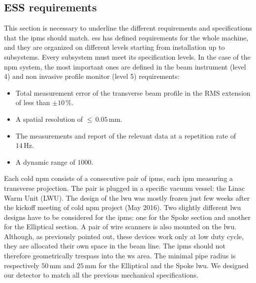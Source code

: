 \begin{refsection}
  \section{ESS requirements}
  This section is necessary to underline the different requirements and specifications that the \acrshort{ipm}s should match. \acrshort{ess} has defined requirements for the whole machine, and they are organized on different levels starting from installation up to subsystems. Every subsystem must meet its specification levels. In the case of the \acrshort{npm} system, the most important ones are defined in the beam instrument (level 4) and non invasive profile monitor (level 5) requirements:
  \begin{itemize}
    \item Total measurement error of the transverse beam profile in the RMS extension of less than $\pm10\,\%$.
    \item A spatial resolution of \(\leq\,0.05\,\mathrm{mm}\).
    \item The measurements and report of the relevant data at a repetition rate of \(14\,\mathrm{Hz}\).
    \item A dynamic range of $1000$.
  \end{itemize}

  Each cold \acrshort{npm} consists of a consecutive pair of \acrshort{ipm}s, each \acrshort{ipm} measuring a transverse projection. The pair is plugged in a specific vacuum vessel: the Linac Warm Unit (LWU). The design of the \acrshort{lwu} was mostly frozen just few weeks after the kickoff meeting of cold \acrshort{npm} project (May 2016). Two slightly different \acrshort{lwu} designs have to be considered for the \acrshort{ipm}s: one for the Spoke section and another for the Elliptical section. A pair of wire scanners is also mounted on the \acrshort{lwu}. Although, as previously pointed out, these devices work only at low duty cycle, they are allocated their own space in the beam line. The \acrshort{ipm}s should not therefore geometrically trespass into the \acrshort{ws} area. The minimal pipe radius is respectively \(50\,\mathrm{mm}\) and \(25\,\mathrm{mm}\) for the Elliptical and the Spoke \acrshort{lwu}. We designed our detector to match all the previous mechanical specifications.

  


\end{refsection}
